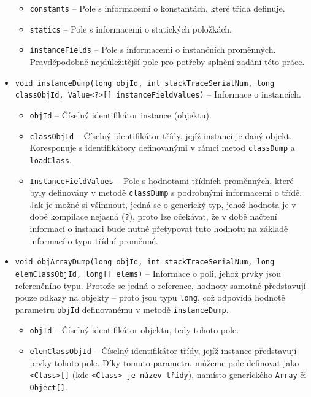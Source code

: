 \begin{itemize}
\begin{itemize}
            \item \texttt{constants} -- Pole s informacemi o konstantách, které třída definuje.
            \item \texttt{statics} -- Pole s informacemi o statických položkách.
            \item \texttt{instanceFields} -- Pole s informacemi o instančních proměnných. Pravděpodobně nejdůležitější pole pro potřeby splnění zadání této práce.
        \end{itemize}
    \item \texttt{void instanceDump(long objId, int stackTraceSerialNum, long \\ classObjId, Value<?>[] instanceFieldValues)} -- Informace o instancích.
        \begin{itemize}
            \item \texttt{objId} -- Číselný identifikátor instance (objektu).
            \item \texttt{classObjId} -- Číselný identifikátor třídy, jejíž instancí je daný objekt. Koresponuje s identifikátory definovanými v rámci metod \texttt{classDump} a \texttt{loadClass}.
            \item \texttt{InstanceFieldValues} -- Pole s hodnotami třídních proměnných, které byly definovány v metodě \texttt{classDump} s podrobnými informacemi o třídě. Jak je možné si všimnout, jedná se o generický typ, jehož hodnota je v době kompilace nejasná (\texttt{?}), proto lze očekávat, že v době načtení informací o instanci bude nutné přetypovat tuto hodnotu na základě informací o typu třídní proměnné.
        \end{itemize}
    \item \texttt{void objArrayDump(long objId, int stackTraceSerialNum, long \\ elemClassObjId, long[] elems)} -- Informace o poli, jehož prvky jsou referenčního typu. Protože se jedná o reference, hodnoty samotné představují pouze odkazy na objekty -- proto jsou typu \texttt{long}, což odpovídá hodnotě parametru \texttt{objId} definovanému v metodě \texttt{instanceDump}.
    \begin{itemize}
        \item \texttt{objId} -- Číselný identifikátor objektu, tedy tohoto pole.
        \item \texttt{elemClassObjId} -- Číselný identifikátor třídy, jejíž instance představují prvky tohoto pole. Díky tomuto parametru můžeme pole definovat jako \texttt{<Class>[]} (kde \texttt{<Class> je název třídy}), namísto generického \texttt{Array} či \texttt{Object[]}.

\end{itemize}
\end{itemize}

